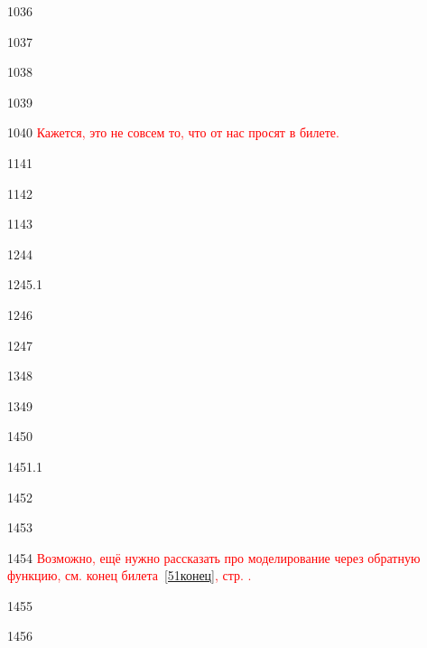 {10}{36}

{10}{37}

{10}{38}

{10}{39}

{10}{40}
\textcolor{red}{Кажется, это не совсем то, что от нас просят в билете.}

{11}{41}

{11}{42}

{11}{43}

{12}{44}

{12}{45.1}

{12}{46}

{12}{47}

{13}{48}

{13}{49}

{14}{50}

{14}{51.1}
\label{51конец}

{14}{52}

{14}{53}

{14}{54}
\textcolor{red}{Возможно, ещё нужно рассказать про моделирование через обратную функцию, см. конец билета~\ref{51конец}, стр. \pageref{51конец}.}

{14}{55}

{14}{56}


